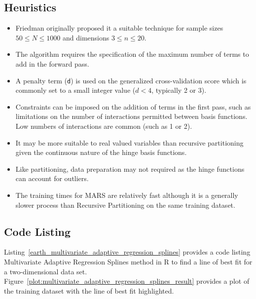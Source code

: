 \subsection{Heuristics}

\begin{itemize}
	\item Friedman originally proposed it a suitable technique for sample sizes $50 \leq N \leq 1000$ and dimensions $3 \leq n \leq 20$.
	\item The algorithm requires the specification of the maximum number of terms to add in the forward pass. %
	\item A penalty term (\texttt{d}) is used on the generalized cross-validation score which is commonly set to a small integer value ($d<4$, typically 2 or 3).
	\item Constraints can be imposed on the addition of terms in the first pass, such as limitations on the number of interactions permitted between basis functions. Low numbers of interactions are common (such as 1 or 2).
	\item It may be more suitable to real valued variables than recursive partitioning given the continuous nature of the hinge basis functions.
	\item Like partitioning, data preparation may not required as the hinge functions can account for outliers.
	\item The training times for MARS are relatively fast although it is a generally slower process than Recursive Partitioning on the same training dataset.
\end{itemize}

\subsection{Code Listing}
Listing~\ref{earth_multivariate_adaptive_regression_splines} provides a code listing Multivariate Adaptive Regression Splines method in R to find a line of best fit for a two-dimensional data set.
Figure~\ref{plot:multivariate_adaptive_regression_splines_result} provides a plot of the training dataset with the line of best fit highlighted.

